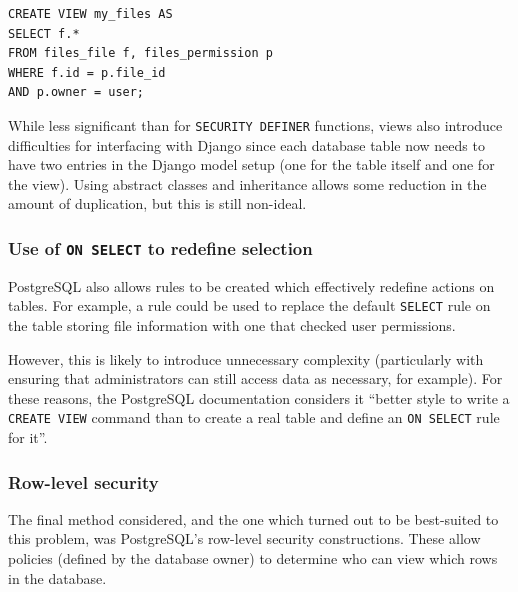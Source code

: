 \documentclass{article}
\begin{document}
\begin{verbatim}
CREATE VIEW my_files AS
SELECT f.*
FROM files_file f, files_permission p
WHERE f.id = p.file_id
AND p.owner = user;
\end{verbatim}

While less significant than for \texttt{SECURITY DEFINER} functions, views also introduce difficulties for interfacing with Django since each database table now needs to have two entries in the Django model setup (one for the table itself and one for the view). Using abstract classes and inheritance allows some reduction in the amount of duplication, but this is still non-ideal.

\subsubsection{Use of \texttt{ON SELECT} to redefine selection}
PostgreSQL also allows rules to be created which effectively redefine actions on tables. For example, a rule could be used to replace the default \texttt{SELECT} rule on the table storing file information with one that checked user permissions.

However, this is likely to introduce unnecessary complexity (particularly with ensuring that administrators can still access data as necessary, for example). For these reasons, the PostgreSQL documentation considers it ``better style to write a \texttt{CREATE VIEW} command than to create a real table and define an \texttt{ON SELECT} rule for it''\cite{postgres-CREATE_RULE}.

\subsubsection{Row-level security}
The final method considered, and the one which turned out to be best-suited to this problem, was PostgreSQL's row-level security constructions. These allow policies (defined by the database owner) to determine who can view which rows in the database.
\end{document}
